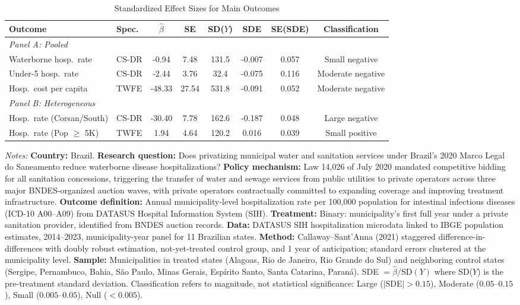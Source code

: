 \begin{table}[H]
\centering
\caption{Standardized Effect Sizes for Main Outcomes}
\label{tab:sde}
\begin{threeparttable}
\footnotesize
\begin{tabular}{llcccccc}
\toprule
Outcome & Spec. & $\hat{\beta}$ & SE & SD($Y$) & SDE & SE(SDE) & Classification \\
\midrule
\multicolumn{8}{l}{\textit{Panel A: Pooled}} \\
Waterborne hosp.\ rate & CS-DR & -0.94 & 7.48 & 131.5 & -0.007 & 0.057 & Small negative \\
Under-5 hosp.\ rate & CS-DR & -2.44 & 3.76 & 32.4 & -0.075 & 0.116 & Moderate negative \\
Hosp.\ cost per capita & TWFE & -48.33 & 27.54 & 531.8 & -0.091 & 0.052 & Moderate negative \\
\midrule
\multicolumn{8}{l}{\textit{Panel B: Heterogeneous}} \\
Hosp.\ rate (Corsan/South) & CS-DR & -30.40 & 7.78 & 162.6 & -0.187 & 0.048 & Large negative \\
Hosp.\ rate (Pop $\geq$ 5K) & TWFE & 1.94 & 4.64 & 120.2 & 0.016 & 0.039 & Small positive \\
\bottomrule
\end{tabular}
\begin{tablenotes}[flushleft]
\small
\item \textit{Notes:} \textbf{Country:} Brazil. \textbf{Research question:} Does privatizing municipal water and sanitation services under Brazil's 2020 Marco Legal do Saneamento reduce waterborne disease hospitalizations? \textbf{Policy mechanism:} Law 14,026 of July 2020 mandated competitive bidding for all sanitation concessions, triggering the transfer of water and sewage services from public utilities to private operators across three major BNDES-organized auction waves, with private operators contractually committed to expanding coverage and improving treatment infrastructure. \textbf{Outcome definition:} Annual municipality-level hospitalization rate per 100,000 population for intestinal infectious diseases (ICD-10 A00--A09) from DATASUS Hospital Information System (SIH). \textbf{Treatment:} Binary: municipality's first full year under a private sanitation provider, identified from BNDES auction records. \textbf{Data:} DATASUS SIH hospitalization microdata linked to IBGE population estimates, 2014--2023, municipality-year panel for 11 Brazilian states. \textbf{Method:} Callaway--Sant'Anna (2021) staggered difference-in-differences with doubly robust estimation, not-yet-treated control group, and 1 year of anticipation; standard errors clustered at the municipality level. \textbf{Sample:} Municipalities in treated states (Alagoas, Rio de Janeiro, Rio Grande do Sul) and neighboring control states (Sergipe, Pernambuco, Bahia, S\~{a}o Paulo, Minas Gerais, Esp\'{i}rito Santo, Santa Catarina, Paran\'{a}). SDE $= \hat{\beta} / \text{SD}(Y)$ where SD($Y$) is the pre-treatment standard deviation. Classification refers to magnitude, not statistical significance: Large ($|$SDE$| > 0.15$), Moderate ($0.05$--$0.15$), Small ($0.005$--$0.05$), Null ($< 0.005$).

\end{tablenotes}
\end{threeparttable}
\end{table}
